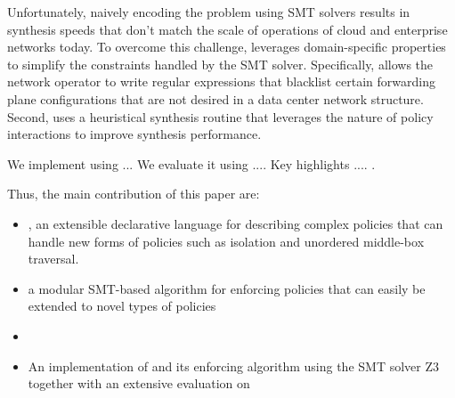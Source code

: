 Unfortunately, naively encoding the problem using SMT solvers results in synthesis
speeds that don't match the scale of operations of cloud and
enterprise networks today.  To overcome this challenge, \Name  
leverages domain-specific properties to simplify
the constraints handled by the SMT solver.  
Specifically, \Name allows the network operator to 
write regular expressions that
blacklist certain forwarding plane configurations
that are not desired in a data center network
structure. 
 Second, \Name uses
a heuristical synthesis routine that leverages the nature of policy
interactions to improve synthesis performance.  


We implement \Name using ... We evaluate it using .... Key highlights .... .

Thus, the main contribution of this paper are: 
\begin{itemize}
\item \Name, an extensible declarative language for describing complex policies that can
		handle new forms of policies such as isolation and unordered middle-box traversal.				
\item a modular SMT-based algorithm for enforcing \Name policies that can easily be extended
			to novel types of policies 
\item {}
\item An implementation of \Name and its enforcing algorithm using the SMT
		solver Z3 together with an extensive evaluation on 
\end{itemize}

